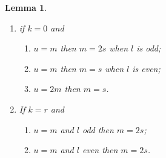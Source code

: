 \documentclass[12pt, a4paper]{article}
\newtheorem{lemma}[thm]{Lemma}
\begin{document}
\begin{lemma}
  \begin{enumerate}
  \item if $k = 0$ and 
    \begin{enumerate}
    \item  $u=m$ then $m=2s$ when $l$ is odd;
    \item  $u=m$ then $m=s$ when $l$ is even;
    \item  $u=2m$ then $m=s$.
    \end{enumerate}
  \item If $k = r$ and
    \begin{enumerate}
    \item  $u=m$ and $l$ odd then $m=2s$;
    \item  $u=m$ and $l$ even then $m=2s$.
    \end{enumerate}
   \end{enumerate}
\end{lemma}
\end{document}
